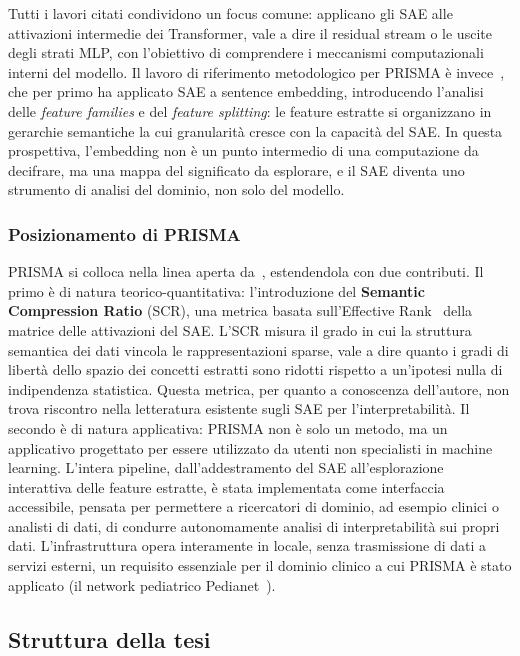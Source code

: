 Tutti i lavori citati condividono un focus comune: applicano gli SAE alle attivazioni intermedie dei Transformer, vale a dire il residual stream o le uscite degli strati MLP, con l'obiettivo di comprendere i meccanismi computazionali interni del modello. Il lavoro di riferimento metodologico per PRISMA è invece~\parencite{oneill2024disentangling}, che per primo ha applicato SAE a sentence embedding, introducendo l'analisi delle \textit{feature families} e del \textit{feature splitting}: le feature estratte si organizzano in gerarchie semantiche la cui granularità cresce con la capacità del SAE. In questa prospettiva, l'embedding non è un punto intermedio di una computazione da decifrare, ma una mappa del significato da esplorare, e il SAE diventa uno strumento di analisi del dominio, non solo del modello.
\subsubsection{Posizionamento di PRISMA}
\label{subsubsec:01_posizionamento}

PRISMA si colloca nella linea aperta da~\parencite{oneill2024disentangling}, estendendola con due contributi.
Il primo è di natura teorico-quantitativa: l'introduzione del \textbf{Semantic Compression Ratio} (SCR), una metrica basata sull'Effective Rank~\parencite{roy2007effective} della matrice delle attivazioni del SAE. L'SCR misura il grado in cui la struttura semantica dei dati vincola le rappresentazioni sparse, vale a dire quanto i gradi di libertà dello spazio dei concetti estratti sono ridotti rispetto a un'ipotesi nulla di indipendenza statistica. Questa metrica, per quanto a conoscenza dell'autore, non trova riscontro nella letteratura esistente sugli SAE per l'interpretabilità.
Il secondo è di natura applicativa: PRISMA non è solo un metodo, ma un applicativo progettato per essere utilizzato da utenti non specialisti in machine learning. L'intera pipeline, dall'addestramento del SAE all'esplorazione interattiva delle feature estratte, è stata implementata come interfaccia accessibile, pensata per permettere a ricercatori di dominio, ad esempio clinici o analisti di dati, di condurre autonomamente analisi di interpretabilità sui propri dati. L'infrastruttura opera interamente in locale, senza trasmissione di dati a servizi esterni, un requisito essenziale per il dominio clinico a cui PRISMA è stato applicato (il network pediatrico Pedianet~\parencite{cantarutti2021pedianet}).
\subsection{Struttura della tesi}
\label{subsec:01_struttura}

